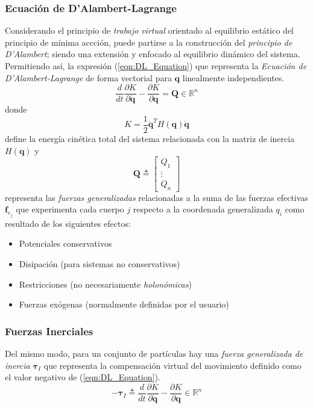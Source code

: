     \subsubsection{Ecuación de D'Alambert-Lagrange}
    Considerando el principio de \emph{trabajo virtual} orientado al equilibrio estático del principio de mínima accción, puede partirse a la
    construcción del \emph{principio de D'Alambert}; siendo una extensión y enfocado al equilibrio dinámico del sistema.  Permitiendo así, la 
    expresión (\ref{eqn:DL_Equation}) que representa la \emph{Ecuación de D'Alambert-Lagrange} de forma vectorial para $\boldsymbol{q}$ linealmente
    independientes.
    \begin{equation} 
        \label{eqn:DL_Equation}
         \frac{d}{dt} \frac{\partial K}{\partial \boldsymbol{\dot{q}}} - \frac{\partial K}{\partial \boldsymbol{q}} = \boldsymbol{Q}
         \in \mathbb{R}^n
    \end{equation}
    donde
    \begin{equation}
        \label{eqn:kinetic_energy}
         K = \frac{1}{2} \boldsymbol{\dot{q}}^T H(\boldsymbol{q}) \boldsymbol{\dot{q}}
    \end{equation}
    define la energía cinética total del sistema relacionada con la matriz de inercia $H(\boldsymbol{q})$ y 
    \begin{equation}
        \label{eqn:fuerzas_generalizadas}
         \boldsymbol{Q} \triangleq \begin{bmatrix} Q_1 \\ \vdots \\ Q_n \end{bmatrix}
    \end{equation}
    representa las \emph{fuerzas generalizadas}
    relacionadas a la suma de las fuerzas efectivas $\boldsymbol{f}_{e_j}$ que experimenta cada cuerpo $j$ respecto a la coordenada generalizada $q_i$
    como resultado de los siguientes efectos:
    \begin{itemize}
        \item Potenciales conservativos
        \item Disipación (para sistemas no conservativos)
        \item Restricciones (no necesariamente \emph{holonómicas})
        \item Fuerzas exógenas (normalmente definidas por el usuario)
    \end{itemize}

    \subsubsection{Fuerzas Inerciales}   
    Del mismo modo, para un conjunto de partículas hay una \emph{fuerza generalizada de inercia} $\boldsymbol{\tau}_I$ que representa la compensación
    virtual del movimiento definido como el valor negativo de (\ref{eqn:DL_Equation}). 
    \begin{equation}
        \label{eqn:inertia_general_force}
        -\boldsymbol{\tau}_I \triangleq \frac{d}{dt} \frac{\partial K}{\partial \boldsymbol{\dot{q}}} - \frac{\partial K}{\partial \boldsymbol{q}} \in \mathbb{R}^n
    \end{equation}
    
